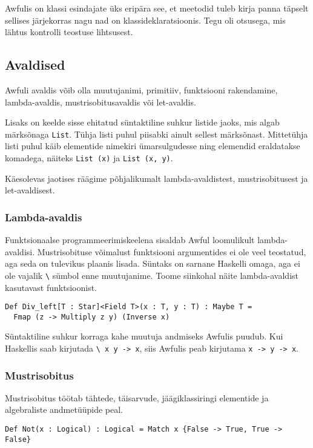\documentclass[12pt]{article}
\begin{document}
        Awfulis on klassi esindajate üks eripära see, et meetodid tuleb kirja panna täpselt sellises järjekorras nagu nad on klassideklaratsioonis. Tegu oli otsusega, mis lähtus kontrolli teostuse lihtsusest.
    \subsection{Avaldised}
      Awfuli avaldis võib olla muutujanimi, primitiiv, funktsiooni rakendamine, lambda-avaldis, mustrisobitusavaldis või let-avaldis.

      Lisaks on keelde sisse ehitatud süntaktiline suhkur listide jaoks, mis algab märksõnaga \verb!List!. Tühja listi puhul piisabki ainult sellest märksõnast. Mittetühja listi puhul käib elementide nimekiri ümarsulgudesse ning elemendid eraldatakse komadega, näiteks \verb!List (x)! ja \verb!List (x, y)!.

        Käesolevas jaotises räägime põhjalikumalt lambda-avaldistest, mustrisobitusest ja let-avaldisest.
      \subsubsection{Lambda-avaldis}
        Funktsionaalse programmeerimiskeelena sisaldab Awful loomulikult lambda-avaldisi. Mustrisobituse võimalust funktsiooni argumentides ei ole veel teostatud, aga seda on tulevikus plaanis lisada. Süntaks on sarnane Haskelli omaga, aga ei ole vajalik \verb!\! sümbol enne muutujanime. Toome siinkohal näite lambda-avaldist kasutavast funktsioonist.

        \begin{verbatim}Def Div_left[T : Star]<Field T>(x : T, y : T) : Maybe T =
  Fmap (z -> Multiply z y) (Inverse x)\end{verbatim}

        Süntaktiline suhkur korraga kahe muutuja andmiseks Awfulis puudub. Kui Haskellis saab kirjutada \verb!\ x y -> x!, siis Awfulis peab kirjutama \verb!x -> y -> x!.
      \subsubsection{Mustrisobitus}\label{match}
        Mustrisobitus töötab tähtede, täisarvude, jäägiklassiringi elementide ja algebraliste andmetüüpide peal.

        \begin{verbatim}Def Not(x : Logical) : Logical = Match x {False -> True, True -> False}\end{verbatim}
\end{document}
